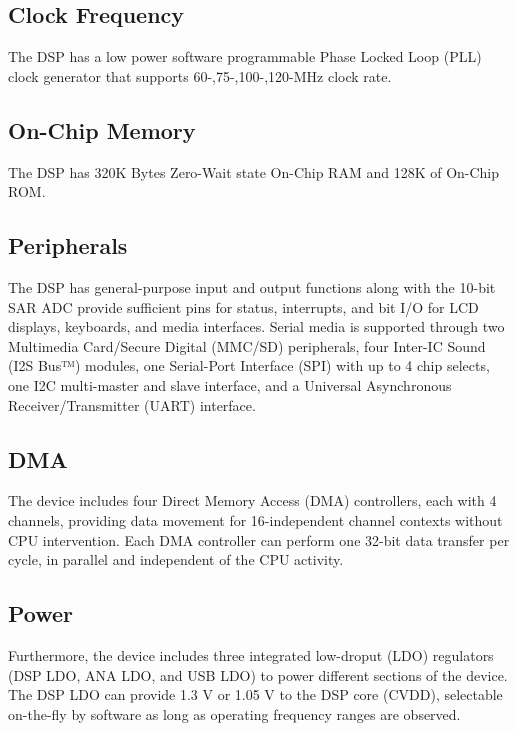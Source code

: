 \subsection{Clock Frequency}The DSP has a low power software programmable Phase Locked Loop (PLL) clock generator that  supports 60-,75-,100-,120-MHz clock rate.  
\subsection{On-Chip Memory}The DSP has 320K Bytes Zero-Wait state On-Chip RAM and 128K of On-Chip ROM. 

\subsection{Peripherals} The DSP has general-purpose input and output functions along with the 10-bit SAR ADC provide sufficient pins for status, interrupts, and bit I/O for LCD displays, keyboards, and media interfaces. Serial media is supported through two Multimedia Card/Secure Digital (MMC/SD) peripherals, four Inter-IC Sound (I2S Bus™) modules, one Serial-Port Interface (SPI) with up to 4 chip selects, one I2C multi-master and slave interface, and a Universal Asynchronous Receiver/Transmitter (UART) interface. 

\subsection{DMA} The device includes four Direct Memory Access (DMA) controllers, each with 4 channels, providing data movement for 16-independent channel contexts without CPU intervention. Each DMA controller can perform one 32-bit data transfer per cycle, in parallel and independent of the CPU activity.


\subsection{Power} Furthermore, the device includes three integrated low-droput (LDO) regulators (DSP LDO, ANA LDO, and USB LDO) to power different sections of the device. The DSP LDO can provide 1.3 V or 1.05 V to the DSP core (CVDD), 
selectable on-the-fly by software as long as operating frequency ranges are observed. 


